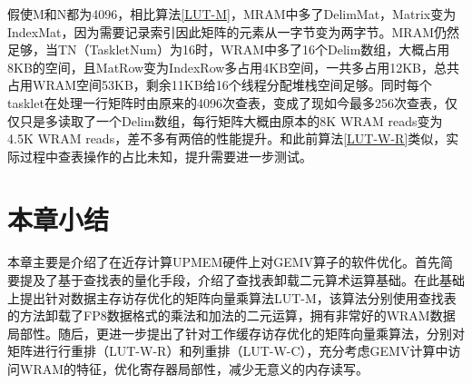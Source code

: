 假使M和N都为4096，相比算法\ref{LUT-M}，MRAM中多了DelimMat，Matrix变为IndexMat，因为需要记录索引因此矩阵的元素从一字节变为两字节。MRAM仍然足够，当TN（TaskletNum）为16时，WRAM中多了16个Delim数组，大概占用8KB的空间，且MatRow变为IndexRow多占用4KB空间，一共多占用12KB，总共占用WRAM空间53KB，剩余11KB给16个线程分配堆栈空间足够。同时每个tasklet在处理一行矩阵时由原来的4096次查表，变成了现如今最多256次查表，仅仅只是多读取了一个Delim数组，每行矩阵大概由原本的8K WRAM reads变为4.5K WRAM reads，差不多有两倍的性能提升。和此前算法\ref{LUT-W-R}类似，实际过程中查表操作的占比未知，提升需要进一步测试。

\section{本章小结}
本章主要是介绍了在近存计算UPMEM硬件上对GEMV算子的软件优化。首先简要提及了基于查找表的量化手段，介绍了查找表卸载二元算术运算基础。在此基础上提出针对数据主存访存优化的矩阵向量乘算法LUT-M，该算法分别使用查找表的方法卸载了FP8数据格式的乘法和加法的二元运算，拥有非常好的WRAM数据局部性。随后，更进一步提出了针对工作缓存访存优化的矩阵向量乘算法，分别对矩阵进行行重排（LUT-W-R）和列重排（LUT-W-C），充分考虑GEMV计算中访问WRAM的特征，优化寄存器局部性，减少无意义的内存读写。